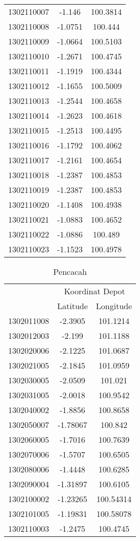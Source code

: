 \begin{longtable}{@{}lcc@{}}
1302110007 & -1.146 & 100.3814\\ 
1302110008 & -1.0751 & 100.444\\ 
1302110009 & -1.0664 & 100.5103\\ 
1302110010 & -1.2671 & 100.4745\\ 
1302110011 & -1.1919 & 100.4344\\ 
1302110012 & -1.1655 & 100.5009\\ 
1302110013 & -1.2544 & 100.4658\\ 
1302110014 & -1.2623 & 100.4618\\ 
1302110015 & -1.2513 & 100.4495\\ 
1302110016 & -1.1792 & 100.4062\\ 
1302110017 & -1.2161 & 100.4654\\ 
1302110018 & -1.2387 & 100.4853\\ 
1302110019 & -1.2387 & 100.4853\\ 
1302110020 & -1.1408 & 100.4938\\ 
1302110021 & -1.0883 & 100.4652\\ 
1302110022 & -1.0886 & 100.489\\ 
1302110023 & -1.1523 & 100.4978\\
\end{longtable}


\begin{table*}\centering
{}
\caption{Pencacah}
\label{tbl:enumerator_full}
\begin{tabular}{lcc}
\toprule
& \multicolumn{2}{c}{Koordinat Depot}\\
\cmidrule{2-3}
& Latitude & Longitude\\ 
\midrule
1302011008 & -2.3905 & 101.1214\\
1302012003 & -2.199 & 101.1188\\
1302020006 & -2.1225 & 101.0687\\
1302021005 & -2.1845 & 101.0959\\
1302030005 & -2.0509 & 101.021\\
1302031005 & -2.0018 & 100.9542\\
1302040002 & -1.8856 & 100.8658\\
1302050007 & -1.78067 & 100.842\\
1302060005 & -1.7016 & 100.7639\\
1302070006 & -1.5707 & 100.6505\\
1302080006 & -1.4448 & 100.6285\\
1302090004 & -1.31897 & 100.6105\\
1302100002 & -1.23265 & 100.54314\\
1302101005 & -1.19831 & 100.58078\\
1302110003 & -1.2475 & 100.4745\\
\bottomrule
\end{tabular}
\end{table*}


